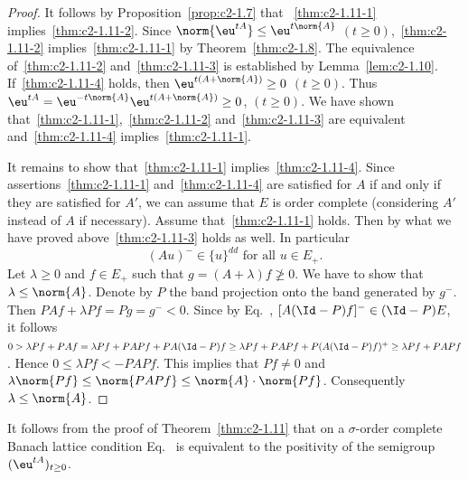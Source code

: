 \begin{proof}
It follows by Proposition~\ref{prop:c2-1.7}   that ~\ref{thm:c2-1.11-1}   implies~\ref{thm:c2-1.11-2}.
Since $\norm{\eu^{tA}} \leq \eu^{t\norm{A}}$ $(t\geq0)$,~\ref{thm:c2-1.11-2}   implies~\ref{thm:c2-1.11-1}   by Theorem~\ref{thm:c2-1.8}.
The equivalence of~\ref{thm:c2-1.11-2}   and~\ref{thm:c2-1.11-3}   is established by Lemma~\ref{lem:c2-1.10}.
If~\ref{thm:c2-1.11-4} holds, then $\eu^{t(A+\norm{A})} \geq 0$ $(t\geq0)$.
Thus $\eu^{tA} = \eu^{-t\norm{A}} \eu^{t(A+\norm{A})} \geq 0$, $(t\geq0)$.
We have shown that~\ref{thm:c2-1.11-1},~\ref{thm:c2-1.11-2}  and~\ref{thm:c2-1.11-3} are equivalent and~\ref{thm:c2-1.11-4}  implies~\ref{thm:c2-1.11-1}.

It remains to show that~\ref{thm:c2-1.11-1}  implies~\ref{thm:c2-1.11-4}.
Since assertions~\ref{thm:c2-1.11-1}   and~\ref{thm:c2-1.11-4}   are satisfied for $A$ if and only if they are satisfied for $A'$, we can assume that $E$ is order complete (considering $A'$ instead of\/ $A$ if necessary).
Assume that~\ref{thm:c2-1.11-1}   holds.
Then by what we have proved above~\ref{thm:c2-1.11-3}   holds as well.
In particular
\begin{equation}\label{eq:c2-1.9}
(Au)^{-} \in \{u\}^{dd} \text{ for all } u \in E_{+}.
\end{equation}
Let $\lambda \geq 0$ and $f \in E_{+}$ such that $g = (A + \lambda)f \not\geq 0$.
We have to show that $\lambda \leq \norm{A}$.
Denote by $P$ the band projection onto the band generated by $g^{-}$.
Then $PAf + \lambda Pf = Pg = g^{-} < 0$.
Since by  Eq.~, $[A(\Id - P)f]^{-} \in (\Id - P)E$, it follows 
$0 > \lambda Pf + PAf = \lambda Pf + PAPf + PA(\Id-P)f \geq \lambda Pf + PAPf + P(A(\Id-P)f)^{+} \geq \lambda Pf + PAPf$.
Hence $0 \leq \lambda Pf < -PAPf$.
This implies that $Pf \neq 0$ and $\lambda\norm{Pf} \leq \norm{PAPf} \leq \norm{A}\cdot\norm{Pf}$.
Consequently $\lambda \leq \norm{A}$.
\end{proof}
\begin{remark}\label{rem:c2-1.12}
%
It follows from the proof of Theorem~\ref{thm:c2-1.11}   that on a $\sigma$-order complete Banach lattice condition  Eq.~ is equivalent to the positivity of the semigroup $(\eu^{tA})_{t \geq 0}$.
\end{remark}
